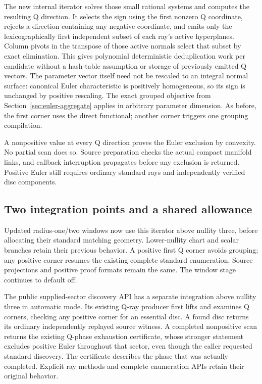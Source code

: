 The new internal iterator solves those small rational systems and computes
the resulting Q direction. It selects the sign using the first nonzero Q
coordinate, rejects a direction containing any negative coordinate, and
emits only the lexicographically first independent subset of each ray's
active hyperplanes. Column pivots in the transpose of those active normals
select that subset by exact elimination. This gives polynomial deterministic
deduplication work per candidate without a hash-table assumption or storage
of previously emitted Q vectors. The parameter vector itself need not be
rescaled to an integral normal surface: canonical Euler characteristic is
positively homogeneous, so its sign is unchanged by positive rescaling.
The exact grouped objective from Section~\ref{sec:euler-aggregate} applies
in arbitrary parameter dimension. As before, the first corner uses the
direct functional; another corner triggers one grouping compilation.

A nonpositive value at every Q direction proves the Euler exclusion by
convexity. No partial scan does so. Source preparation checks the actual
compact manifold links, and callback interruption propagates before any
exclusion is returned. Positive Euler still requires ordinary standard
rays and independently verified disc components.

\subsection{Two integration points and a shared allowance}

Updated radius-one/two windows now use this iterator above nullity three,
before allocating their standard matching geometry. Lower-nullity chart
and scalar branches retain their previous behavior. A positive first Q
corner avoids grouping; any positive corner resumes the existing complete
standard enumeration. Source projections and positive proof formats remain
the same. The window stage continues to default off.

The public supplied-sector discovery API has a separate integration above
nullity three in automatic mode. Its existing Q-ray producer first lifts
and examines Q corners, checking any positive corner for an essential disc.
A found disc returns its ordinary independently replayed source witness.
A completed nonpositive scan returns the existing Q-phase exhaustion
certificate, whose stronger statement excludes positive Euler throughout
that sector, even though the caller requested standard discovery. The
certificate describes the phase that was actually completed. Explicit ray
methods and complete enumeration APIs retain their original behavior.

